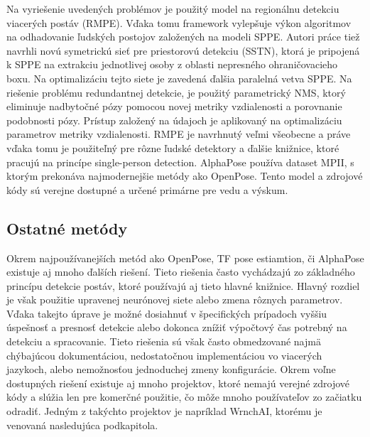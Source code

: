 \documentclass[slovak,master,dept460,male,cpp,cpdeclaration]{diploma}
\begin{document}
Na vyriešenie uvedených problémov je použitý model na regionálnu detekciu viacerých postáv (RMPE). Vďaka tomu
framework vylepšuje výkon algoritmov na odhadovanie ľudských postojov založených na modeli SPPE. Autori práce tiež navrhli novú symetrickú sieť pre priestorovú detekciu (SSTN), ktorá je pripojená k SPPE na extrakciu jednotlivej osoby z
oblasti nepresného ohraničovacieho boxu. Na optimalizáciu tejto siete je zavedená ďalšia paralelná vetva SPPE. Na riešenie problému redundantnej detekcie, je použitý parametrický NMS, ktorý eliminuje nadbytočné pózy pomocou novej metriky vzdialenosti a porovnanie podobnosti pózy. Prístup založený na údajoch je
aplikovaný na optimalizáciu parametrov metriky vzdialenosti. RMPE je navrhnutý veľmi všeobecne a práve vďaka tomu je použiteľný pre rôzne ľudské detektory a ďalšie knižnice, ktoré pracujú na princípe single-person detection. AlphaPose používa dataset MPII, s ktorým prekonáva najmodernejšie metódy ako OpenPose. Tento model a zdrojové kódy\cite{githubAlphaPose} sú verejne dostupné a určené primárne pre vedu a výskum.

\newpage
\subsection{Ostatné metódy}
Okrem  najpoužívanejších metód ako OpenPose, TF pose estiamtion, či AlphaPose existuje aj mnoho ďalších riešení. Tieto riešenia často vychádzajú zo základného princípu detekcie postáv, ktoré používajú aj tieto hlavné knižnice. Hlavný rozdiel je však použitie upravenej neurónovej siete alebo zmena rôznych parametrov. Vďaka takejto úprave je možné dosiahnuť v špecifických prípadoch vyššiu úspešnosť a presnosť detekcie alebo dokonca znížiť výpočtový čas potrebný na detekciu a spracovanie. Tieto riešenia sú však často obmedzované najmä chýbajúcou dokumentáciou, nedostatočnou implementáciou vo viacerých jazykoch, alebo nemožnosťou jednoduchej zmeny konfigurácie. Okrem voľne dostupných riešení existuje aj mnoho projektov, ktoré nemajú verejné zdrojové kódy a slúžia len pre komerčné použitie, čo môže mnoho používateľov zo začiatku odradiť. Jedným z takýchto projektov je napríklad WrnchAI, ktorému je venovaná nasledujúca podkapitola.
\end{document}
